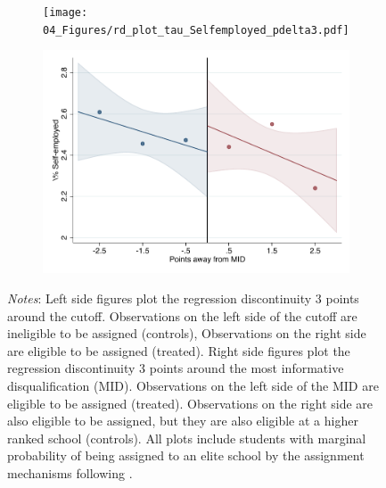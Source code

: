 \documentclass[oneside,11pt]{article}
\begin{document}
\begin{figure}[H]

    \ContinuedFloat
    \caption{(Cont.) RD plots for outcome variables across those assigned to either UNAM or IPN high-school, and those who are not\label{fig:ITT_rd_plot_elite_6}}
    \begin{center}
    
    \begin{subfigure}{0.475\textwidth}
        \centering
        \texttt{[image: 04\_Figures/rd\_plot\_tau\_Selfemployed\_pdelta3.pdf]}
    \end{subfigure}
    \begin{subfigure}{0.475\textwidth}
        \centering
        \includegraphics[width=\textwidth]{04_Figures/rd_plot_mid_Selfemployed_pdelta3.pdf}
    \end{subfigure}
    \end{center}
    
\footnotesize
\textit{Notes}: Left side figures plot the regression discontinuity 3 points around the cutoff. Observations on the left side of the cutoff are ineligible to be assigned (controls), Observations on the right side are eligible to be assigned (treated). Right side figures plot the regression discontinuity 3 points around the most informative disqualification (MID). Observations on the left side of the MID are eligible to be assigned (treated). Observations on the right side are also eligible to be assigned, but they are also eligible at a higher ranked school (controls). All plots include students with marginal probability of being assigned to an elite school by the assignment mechanisms following \citet{abdulkadirouglu2022breaking}. 
\end{figure}
\end{document}
